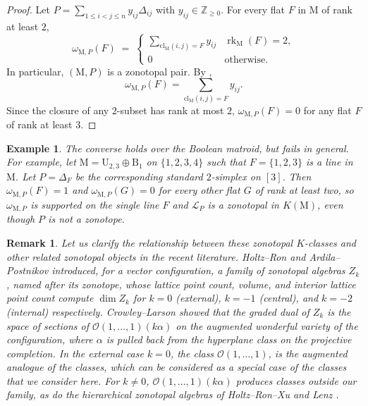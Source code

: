 \documentclass[11pt,a4paper,reqno]{amsart}
\theoremstyle{results}
\theoremstyle{definitions}
\newtheorem{example}[thm]{Example}
\newtheorem{remark}[thm]{Remark}
\def\Z{\mathbb{Z}}
\def\Z{\mathbb{Z}}
\def\calO{\mathcal{O}}
\newcommand{\B}{\textrm{B}}
\newcommand{\cl}{\textrm{cl}}
\newcommand{\rk}{\operatorname{rk}}
\newcommand{\M}{\mathrm{M}}
\newcommand{\cL}{\mathcal{L}}
\newcommand{\U}{\mathrm{U}}
\begin{document}
\begin{proof}
  Let $P = \sum_{1 \leqslant i<j \leqslant n} y_{ij}\Delta_{ij}$ with $y_{ij}\in\Z_{\geqslant0}$. For every flat $F$ in $\M$ of rank at least $2$,
  \begin{equation}\label{eq:wF}
    \omega_{\M, P}(F) \;=\; \begin{cases}
    \sum\limits_{\cl_{\M}(i, j) = F} y_{ij} & \rk_{\M}(F) = 2, \\
    0 & \text{otherwise}.
    \end{cases}
  \end{equation}
  In particular, $(\M,P)$ is a zonotopal pair.
  By ,
  \[
  \omega_{\M, P}(F) = \sum_{\cl_{\M}(i, j) = F} y_{ij}.
  \]
  Since the closure of any $2$-subset has rank at most $2$, $\omega_{\M, P}(F) = 0$ for any flat $F$ of rank at least $3$.
\end{proof}

\begin{example}
  \label{ex:zonotopal-pair}
  The converse holds over the Boolean matroid, but fails in general. For example, let $\M = \U_{2,3} \oplus \B_1$
  on $\{1,2,3,4\}$ such that $F = \{1,2,3\}$ is a line in $\M$. Let
  $P = \Delta_{F}$ be the corresponding standard $2$-simplex on $[3]$. Then
  $\omega_{\M, P}(F) = 1$ and $\omega_{\M, P}(G) = 0$ for every other flat $G$ of rank at least two, so
  $\omega_{\M, P}$ is supported on the single line $F$ and $\cL_P$ is a zonotopal in $K(\M)$, even though $P$ is not a zonotope.
\end{example}

\begin{remark}
  Let us clarify the relationship between these zonotopal $K$-classes
and other related zonotopal objects in the recent literature. Holtz--Ron
\cite{holtz2011zonotopal} and Ardila--Postnikov \cite{ardila2010combinatorics}
introduced, for a vector configuration, a family of zonotopal algebras $Z_k$,
named after its zonotope, whose lattice point count, volume, and interior
lattice point count compute $\dim Z_k$ for $k=0$ (external), $k=-1$ (central),
and $k=-2$ (internal) respectively. Crowley--Larson \cite[Corollary~1.2]{crowley2026cohomological}
showed that the graded dual of $Z_k$ is the space of sections of
$\calO(1,\ldots,1)(k\alpha)$ on the augmented wonderful variety of the
configuration, where $\alpha$ is pulled back from the hyperplane class on the
projective completion. In the external case $k=0$, the class $\calO(1,\ldots,1)$, is the
augmented analogue of the classes, which can be considered as a special case of the classes that we consider here. For $k\neq 0$, $\calO(1, \ldots, 1)(k\alpha)$ produces classes
outside our family, as do the hierarchical zonotopal algebras of
Holtz--Ron--Xu \cite{holtz2012hierarchical} and Lenz \cite{lenz2012hierarchical}.
\end{remark}
\end{document}
